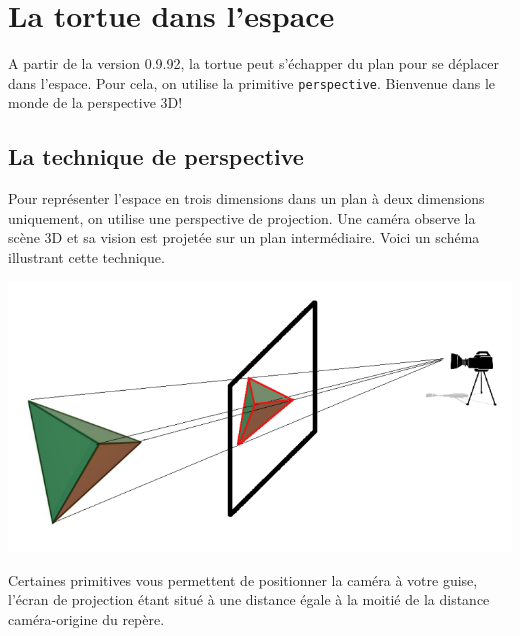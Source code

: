 \section{La tortue dans l'espace} \label{3D}
A partir de la version 0.9.92, la tortue peut s'échapper du plan pour se déplacer dans l'espace. Pour cela, on utilise la primitive \texttt{perspective}. Bienvenue dans le monde de la perspective 3D!
\subsection{La technique de perspective}
Pour représenter l'espace en trois dimensions dans un plan à deux dimensions uniquement, on utilise une perspective de projection. Une caméra observe la scène 3D et sa vision est projetée sur un plan intermédiaire. Voici un schéma illustrant cette technique. 
\begin{center}
\includegraphics*[scale=0.6]{images/perspective.png}
\end{center}
Certaines primitives vous permettent de positionner la caméra à votre guise, l'écran de projection étant situé à une distance égale à la moitié de la distance caméra-origine du repère.
